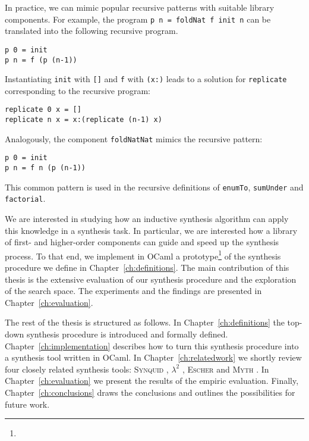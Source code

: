In practice, we can mimic popular recursive patterns with suitable library components. For example, the program \lstinline!p n = foldNat f init n! can be translated into the following recursive program.
\begin{lstlisting}[style=plain]
p 0 = init
p n = f (p (n-1))
\end{lstlisting}
Instantiating \lstinline!init! with \lstinline![]! and \lstinline!f! with \lstinline!(x:)! leads to a solution for \lstinline!replicate! corresponding to the recursive program:
\begin{lstlisting}[style=plain]
replicate 0 x = []
replicate n x = x:(replicate (n-1) x)
\end{lstlisting}

Analogously, the component \lstinline!foldNatNat! mimics the recursive pattern:
\begin{lstlisting}[style=plain]
p 0 = init
p n = f n (p (n-1))
\end{lstlisting}
This common pattern is used in the recursive definitions of \lstinline!enumTo!, \lstinline!sumUnder! and \lstinline!factorial!.

We are interested in studying how an inductive synthesis algorithm can apply this knowledge in a synthesis task. In particular, we are interested how a library of first- and higher-order components can guide and speed up the synthesis process.
To that end, we implement in OCaml a prototype\footnote{} of the synthesis procedure we define in Chapter~\ref{ch:definitions}. The main contribution of this thesis is the extensive evaluation of our synthesis procedure and the exploration of the search space. The experiments and the findings are presented in Chapter~\ref{ch:evaluation}.

The rest of the thesis is structured as follows. In Chapter~\ref{ch:definitions} the top-down synthesis procedure is introduced and formally defined. Chapter~\ref{ch:implementation} describes how to turn this synthesis procedure into a synthesis tool written in OCaml. In Chapter~\ref{ch:relatedwork} we shortly review four closely related synthesis tools: \textsc{Synquid} \cite{SynquidPaper}, $\lambda^2$ \cite{LambdaSquarePaper}, \textsc{Escher} \cite{EscherPaper} and \textsc{Myth} \cite{MythPaper}. In Chapter~\ref{ch:evaluation} we present the results of the empiric evaluation. Finally, Chapter~\ref{ch:conclusions} draws the conclusions and outlines the possibilities for future work.
